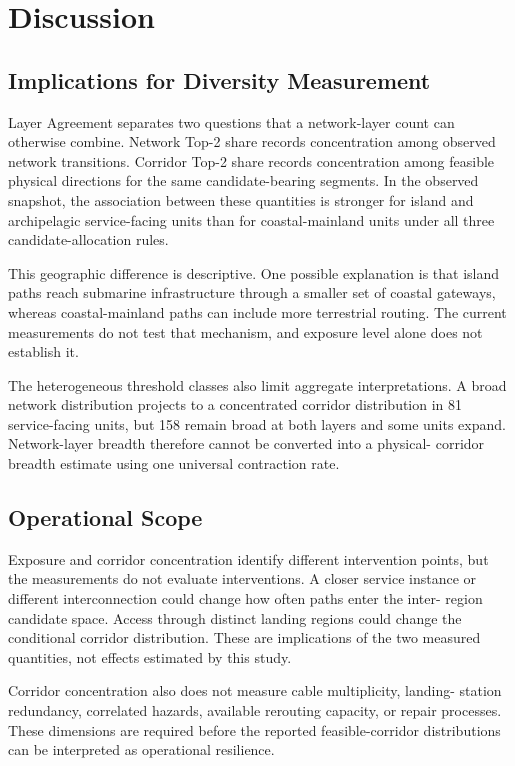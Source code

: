 \section{Discussion}
\label{sec:discussion}

\subsection{Implications for Diversity Measurement}

Layer Agreement separates two questions that a network-layer count can
otherwise combine. Network Top-2 share records concentration among observed
network transitions. Corridor Top-2 share records concentration among feasible
physical directions for the same candidate-bearing segments. In the observed
snapshot, the association between these quantities is stronger for island and
archipelagic service-facing units than for coastal-mainland units under all
three candidate-allocation rules.

This geographic difference is descriptive. One possible explanation is that
island paths reach submarine infrastructure through a smaller set of coastal
gateways, whereas coastal-mainland paths can include more terrestrial routing.
The current measurements do not test that mechanism, and exposure level alone
does not establish it.

The heterogeneous threshold classes also limit aggregate interpretations. A
broad network distribution projects to a concentrated corridor distribution
in 81 service-facing units, but 158 remain broad at both layers and some units
expand. Network-layer breadth therefore cannot be converted into a physical-
corridor breadth estimate using one universal contraction rate.

\subsection{Operational Scope}

Exposure and corridor concentration identify different intervention points,
but the measurements do not evaluate interventions. A closer service instance
or different interconnection could change how often paths enter the inter-
region candidate space. Access through distinct landing regions could change
the conditional corridor distribution. These are implications of the two
measured quantities, not effects estimated by this study.

Corridor concentration also does not measure cable multiplicity, landing-
station redundancy, correlated hazards, available rerouting capacity, or repair
processes. These dimensions are required before the reported feasible-corridor
distributions can be interpreted as operational resilience.

